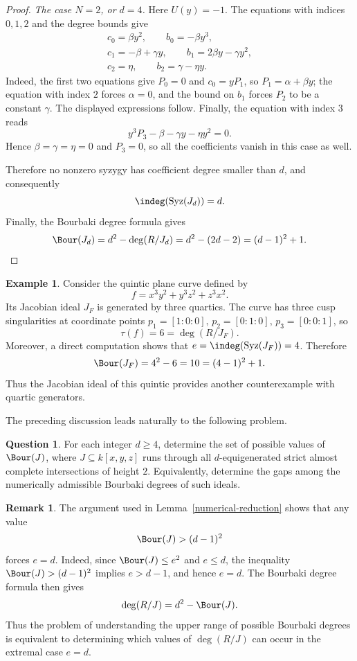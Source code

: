 \documentclass[11pt]{amsart} %
\theoremstyle{definition}
\newtheorem{Remark}[Theorem]{Remark}
\newtheorem{Example}[Theorem]{Example}
\newtheorem{Question}[Theorem]{Question}
\def\syz{\mbox{\rm Syz}}
\begin{document}
\begin{proof}
\smallskip\noindent
\emph{The case $N=2$, or $d=4$.}
Here $U(y)=-1$. The equations with indices $0,1,2$ and the degree
bounds give
\[
\begin{gathered}
c_0=\beta y^2,\qquad b_0=-\beta y^3,\\
c_1=-\beta+\gamma y,\qquad b_1=2\beta y-\gamma y^2,\\
c_2=\eta,\qquad b_2=\gamma-\eta y.
\end{gathered}
\]
Indeed, the first two equations give $P_0=0$ and $c_0=yP_1$,
so $P_1=\alpha+\beta y$; the equation with index $2$ forces
$\alpha=0$, and the bound on $b_1$ forces $P_2$ to be a constant
$\gamma$. The displayed expressions follow.
Finally, the equation with index $3$ reads
\[
y^3P_3-\beta-\gamma y-\eta y^2=0.
\]
Hence $\beta=\gamma=\eta=0$ and $P_3=0$, so all the coefficients
vanish in this case as well.

Therefore no nonzero
syzygy has coefficient degree smaller than $d$, and consequently
\[
\indeg(\syz(J_d))=d.
\]
Finally, the Bourbaki degree formula gives
\[
\Bour(J_d)
=d^2-\deg(R/J_d)
=d^2-(2d-2)
=(d-1)^2+1.
\]
\end{proof}

\begin{Example}\label{ex:quintic-cuspidal}
Consider the quintic plane curve defined by
\[
f=x^3y^2+y^3z^2+z^3x^2.
\]
Its Jacobian ideal $J_F$ is generated by three quartics. The curve has three cusp singularities at coordinate points $p_1=[1:0:0],\, p_2=[0:1:0],\, p_3=[0:0:1]$, so
\[
\tau(f)=6=\deg(R/J_F).
\]
Moreover, a direct computation shows that $e=\indeg(\syz(J_F))=4$. 
Therefore
\[
\Bour(J_F)=4^2-6=10=(4-1)^2+1.
\]
Thus the Jacobian ideal of this quintic provides another counterexample with quartic generators.
\end{Example}




The preceding discussion leads naturally to the following problem.

\begin{Question}
For each integer $d\ge4$, determine the set of possible values of
$\Bour(J)$, where $J\subseteq k[x,y,z]$ runs through all
$d$-equigenerated strict almost complete intersections of height $2$.
Equivalently, determine the gaps among the numerically admissible
Bourbaki degrees of such ideals.
\end{Question}

\begin{Remark}
The argument used in Lemma~\ref{numerical-reduction} shows that any value
\[
\Bour(J)>(d-1)^2
\]
forces $e=d$. Indeed, since $\Bour(J)\le e^2$ and $e\le d$, the inequality
$\Bour(J)>(d-1)^2$ implies $e>d-1$, and hence $e=d$. The Bourbaki degree
formula then gives
\[
\deg(R/J)=d^2-\Bour(J).
\]
Thus the problem of understanding the upper range of possible Bourbaki
degrees is equivalent to determining which values of $\deg(R/J)$ can
occur in the extremal case $e=d$.
\end{Remark}
\end{document}
